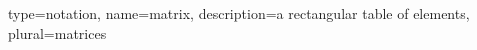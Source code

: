 



{%
   type=notation,
   name={matrix},
   description={a rectangular table of elements},
   plural={matrices}
}

